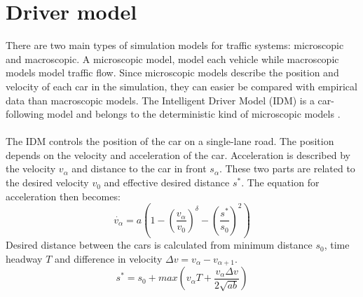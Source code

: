\section{Driver model}
There are two main types of simulation models for traffic systems: microscopic
and macroscopic. A microscopic model, model each vehicle while macroscopic
models model traffic flow. Since microscopic models describe the position
and velocity of each car in the simulation, they can easier be compared with
empirical data than macroscopic models. The Intelligent Driver Model (IDM)
is a car-following model and belongs to the deterministic kind of microscopic
models \cite{idm}.\\\\

The IDM controls the position of the car on a single-lane road. The position depends on the velocity and acceleration of the car. Acceleration is described by the velocity \begin{math}v_\alpha\end{math} and distance to the car in front \begin{math}s_\alpha\end{math}. These two parts are related to the desired velocity \begin{math}v_0\end{math} and effective desired distance \begin{math}s^\ast\end{math}. The equation for acceleration then becomes:
\begin{equation}\label{driver_acc}\dot{v_\alpha} = a\left
(1-(\frac{v_\alpha}{v_0})^\delta-(\frac{s^\ast}{s_0})^2 \right)\end{equation}
Desired distance between the cars is calculated from minimum distance \begin{math}s_0\end{math}, time headway \begin{math}T\end{math} and difference in velocity \begin{math}\Delta v = v_\alpha - v_{\alpha + 1}\end{math}.
\begin{equation}\label{desireddist}s^\ast = s_0 + max \left (v_\alpha T +
\frac{v_\alpha \Delta v}{2\sqrt{ab}}\right )\end{equation}
